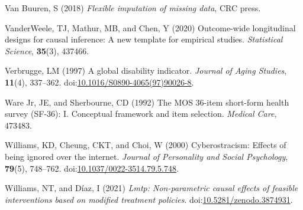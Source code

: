 \documentclass[
  singlecolumn,
  9pt]{article}
\newlength{\cslhangindent}
\newenvironment{CSLReferences}[2] %
 {\begin{list}{}{%
  \setlength{\itemindent}{0pt}
  \setlength{\leftmargin}{0pt}
  \setlength{\parsep}{0pt}
  \ifodd #1
   \setlength{\leftmargin}{\cslhangindent}
   \setlength{\itemindent}{-1\cslhangindent}
  \fi
  \setlength{\itemsep}{#2\baselineskip}}}
 {\end{list}}
\begin{document}
\begin{CSLReferences}{1}{0}
Van Buuren, S (2018) \emph{Flexible imputation of missing data}, CRC
press.

VanderWeele, TJ, Mathur, MB, and Chen, Y (2020) Outcome-wide
longitudinal designs for causal inference: A new template for empirical
studies. \emph{Statistical Science}, \textbf{35}(3), 437466.

Verbrugge, LM (1997) A global disability indicator. \emph{Journal of
Aging Studies}, \textbf{11}(4), 337--362.
doi:\href{https://doi.org/10.1016/S0890-4065(97)90026-8}{10.1016/S0890-4065(97)90026-8}.

Ware Jr, JE, and Sherbourne, CD (1992) The MOS 36-item short-form health
survey (SF-36): I. Conceptual framework and item selection.
\emph{Medical Care}, 473483.

Williams, KD, Cheung, CKT, and Choi, W (2000) Cyberostracism: Effects of
being ignored over the internet. \emph{Journal of Personality and Social
Psychology}, \textbf{79}(5), 748--762.
doi:\href{https://doi.org/10.1037/0022-3514.79.5.748}{10.1037/0022-3514.79.5.748}.

Williams, NT, and Díaz, I (2021) \emph{Lmtp: Non-parametric causal
effects of feasible interventions based on modified treatment policies}.
doi:\href{https://doi.org/10.5281/zenodo.3874931}{10.5281/zenodo.3874931}.

\end{CSLReferences}
\end{document}
